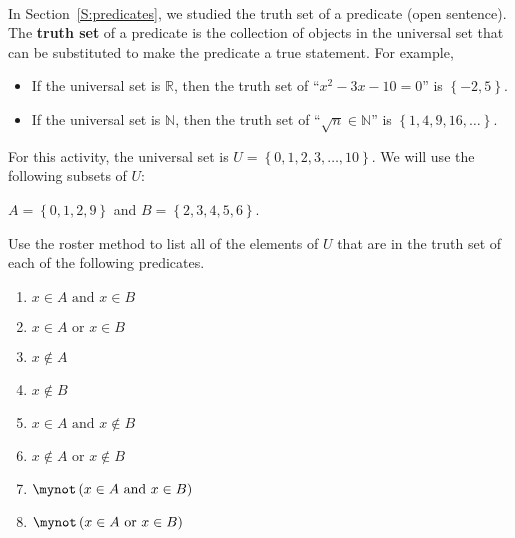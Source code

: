 \hbreak
%
\begin{previewactivity} \label{PA:truthsets} \hfill \\
In Section~\ref{S:predicates}, we studied the truth set of a predicate (open sentence). The \textbf{truth set}
%
 of a predicate is the collection of objects in the universal set that can be substituted to make the predicate a true statement.  For example,
\begin{itemize}
\item If the universal set is  $\mathbb{R}$, then the truth set of  ``$x^2  - 3x - 10 = 0$''  is  $\left\{ { - 2, 5} \right\}$.

\item If the universal set is  $\mathbb{N}$, then the truth set of  ``$\sqrt n  \in \mathbb{N}$''  is $\left\{ {1, 4, 9, 16,  \ldots } \right\}$.
\end{itemize}
For this activity, the universal set is  $U = \left\{ {0, 1, 2, 3,  \ldots , 10} \right\}$.  We will use the following subsets of  $U$:
\begin{center}
$A = \left\{ {0, 1, 2, 9} \right\}$ \quad and \quad  $B = \left\{ {2, 3, 4, 5, 6} \right\}$.
\end{center}
Use the roster method to list all of the elements of  $U$  that are in the truth set of each of the following predicates.  
\begin{multicols}{2}
\begin{enumerate}
  \item $x \in A \text{  and  } x \in B$
  \item $x \in A \text{  or  } x \in B$
  \item $x \notin A$
  \item $x \notin B$
  \item $x \in A\text{  and  }x \notin B$
  \item $x \notin A \text{  or  } x \notin B$
  \item $\mynot  \left( {x \in A\text{  and  }x \in B} \right)$
  \item $\mynot  \left( {x \in A\text{  or  }x \in B} \right)$
\end{enumerate}
\end{multicols}
\end{previewactivity}

\endinput
 

